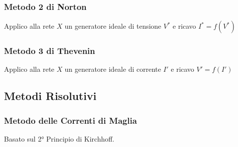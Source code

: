 \documentclass[../main.tex]{subfiles}
\begin{document}
	\subsubsection{Metodo 2 di Norton}
	Applico alla rete $X$ un generatore ideale di tensione $V^*$ e ricavo $I^* = f(V^*)$
	\subsubsection{Metodo 3 di Thevenin}
	Applico alla rete $X$ un generatore ideale di corrente $I'$ e ricavo $V' = f(I')$
	\subsection{Metodi Risolutivi}
	\subsubsection{Metodo delle Correnti di Maglia}
	Basato sul 2° Principio di Kirchhoff.\\
\end{document}
